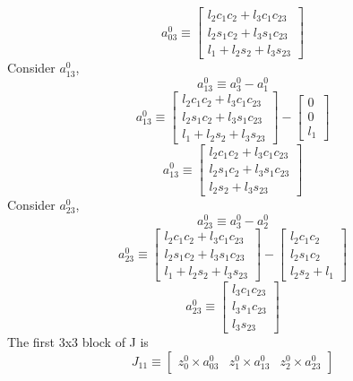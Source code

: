 \documentclass[12pt]{article}
\begin{document}
\[
  a_{03}^0 \equiv
  \begin{bmatrix}
    l_2c_1c_2 + l_3c_1c_{23} \\
    l_2s_1c_2 + l_3s_1c_{23} \\
    l_1 + l_2s_2 + l_3s_{23}
  \end{bmatrix}
\]
Consider $a_{13}^0$,
\[
  a_{13}^0 \equiv a_3^0 - a_1^0
\]
\[
  a_{13}^0 \equiv
  \begin{bmatrix}
    l_2c_1c_2 + l_3c_1c_{23} \\
    l_2s_1c_2 + l_3s_1c_{23} \\
    l_1 + l_2s_2 + l_3s_{23}
  \end{bmatrix}
  -
  \begin{bmatrix}
    0 \\
    0 \\
    l_1
  \end{bmatrix}
\]
\[
  a_{13}^0 \equiv
  \begin{bmatrix}
    l_2c_1c_2 + l_3c_1c_{23} \\
    l_2s_1c_2 + l_3s_1c_{23} \\
    l_2s_2 + l_3s_{23}
  \end{bmatrix}
\]
Consider $a_{23}^0$,
\[
  a_{23}^0 \equiv a_3^0 - a_2^0
\]
\[
  a_{23}^0 \equiv
  \begin{bmatrix}
    l_2c_1c_2 + l_3c_1c_{23} \\
    l_2s_1c_2 + l_3s_1c_{23} \\
    l_1 + l_2s_2 + l_3s_{23}
  \end{bmatrix}
  -
  \begin{bmatrix}
    l_2c_1c_2 \\
    l_2s_1c_2 \\
    l_2s_2 + l_1
  \end{bmatrix}
\]
\[
  a_{23}^0 \equiv
  \begin{bmatrix}
    l_3c_1c_{23} \\
    l_3s_1c_{23} \\
    l_3s_{23}
  \end{bmatrix}
\]
The first 3x3 block of J is
\[
  J_{11} \equiv
  \begin{bmatrix} z_0^0 \times a_{03}^0 & z_1^0 \times a_{13}^0 & z_2^0 \times a_{23}^0\end{bmatrix}
\]
\end{document}
